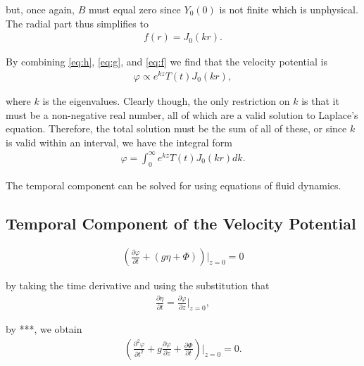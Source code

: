 \documentclass[12pt]{article}
\begin{document}
but, once again, $B$ must equal zero since $Y_0(0)$ is not finite which is unphysical. The radial part thus simplifies to
\begin{align}
\label{eq:f}
f(r) = J_0(kr).
\end{align}

By combining \eqref{eq:h}, \eqref{eq:g}, and \eqref{eq:f} we find that the velocity potential is 
\begin{align*}
\varphi \propto e^{kz}T(t)J_0(kr),
\end{align*}

where $k$ is the eigenvalues. Clearly though, the only restriction on $k$ is that it must be a non-negative real number, all of which are a valid solution to Laplace's equation. Therefore, the total solution must be the sum of all of these, or since $k$ is valid within an interval, we have the integral form 
\begin{align}
\label{eq:phieigen}
\varphi = \int_0^\infty e^{kz}T(t)J_0(kr)dk.
\end{align}

The temporal component can be solved for using equations of fluid dynamics.

\subsection{Temporal Component of the Velocity Potential}

\begin{align*}
\left( \frac{\partial \varphi}{\partial t} + (g \eta + \Phi) \right) \bigg|_{z=0} = 0
\end{align*}

by taking the time derivative and using the substitution that
\begin{align}
\label{eq:smallamp}
\frac{\partial \eta}{\partial t} = \frac{\partial \varphi}{\partial z} \bigg|_{z=0},
\end{align}

by ***, we obtain
\begin{align}
\label{eq:presscond}
\left( \frac{\partial^2 \varphi}{\partial t^2} + g \frac{\partial \varphi}{\partial z} + \frac{\partial \Phi}{\partial t} \right) \bigg|_{z=0} = 0.
\end{align}
\end{document}
